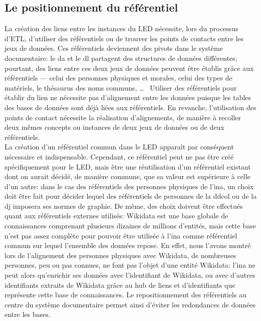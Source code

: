 \subsection{\label{III-B-1-c}Le positionnement du référentiel}

La création des liens entre les instances du LED nécessite, lors du processus d'ETL, d'utiliser des référentiels ou de trouver les points de contacts entre les jeux de données. Ces référentiels deviennent des pivots dans le système documentaire: le \ac{da} et le \ac{dl} partagent des structures de données différentes; pourtant, des liens entre ces deux jeux de données peuvent être établis grâce aux référentiels --- celui des personnes physiques et morales, celui des types de matériels, le thésaurus des noms communs, \dots~ Utiliser des référentiels pour établir du lien ne nécessite pas d'alignement entre les données puisque les tables des bases de données sont déjà liées aux référentiels. En revanche, l'utilisation des points de contact nécessite la réalisation d'alignements, de manière à recoller deux mêmes concepts ou instances de deux jeux de données ou de deux référentiels.\\

La création d'un référentiel commun dans le LED apparaît par conséquent nécessaire et indispensable. Cependant, ce référentiel peut ne pas être créé spécifiquement pour le LED, mais être une réutilisation d'un référentiel existant dont on aurait décidé, de manière commune, que sa valeur est supérieure à celle d'un autre: dans le cas des référentiels des personnes physiques de l'\ac{ina}, un choix doit être fait pour décider lequel des référentiels de personnes de la \ac{ddcol} ou de la \ac{dj} imposera ses normes de graphie. De même, des choix doivent être effectués quant aux référentiels externes utilisés: Wikidata est une base globale de connaissances comprenant plusieurs dizaines de millions d'entités, mais cette base n'est pas assez complète pour pouvoir être utilisée à l'\ac{ina} comme référentiel commun sur lequel l'ensemble des données repose. En effet, nous l'avons montré lors de l'alignement des personnes physiques avec Wikidata, de nombreuses personnes, peu ou pas connues, ne font pas l'objet d'une entité Wikidata: l'\ac{ina} ne peut alors qu'enrichir ses données avec l'identifiant de Wikidata, ou avec d'autres identifiants extraits de Wikidata grâce au hub de liens et d'identifiants que représente cette base de connaissances. Le repositionnement des référentiels au centre du système documentaire permet ainsi d'éviter les redondances de données entre les bases.\\

